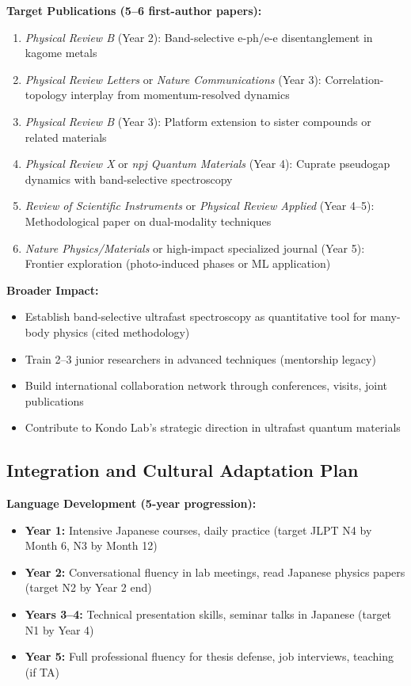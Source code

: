 \documentclass[12pt,a4paper]{article}
\begin{document}
\textbf{Target Publications (5--6 first-author papers):}
\begin{enumerate}
    \item \textit{Physical Review B} (Year 2): Band-selective e-ph/e-e disentanglement in kagome metals
    \item \textit{Physical Review Letters} or \textit{Nature Communications} (Year 3): Correlation-topology interplay from momentum-resolved dynamics
    \item \textit{Physical Review B} (Year 3): Platform extension to sister compounds or related materials
    \item \textit{Physical Review X} or \textit{npj Quantum Materials} (Year 4): Cuprate pseudogap dynamics with band-selective spectroscopy
    \item \textit{Review of Scientific Instruments} or \textit{Physical Review Applied} (Year 4--5): Methodological paper on dual-modality techniques
    \item \textit{Nature Physics/Materials} or high-impact specialized journal (Year 5): Frontier exploration (photo-induced phases or ML application)
\end{enumerate}

\textbf{Broader Impact:}
\begin{itemize}
    \item Establish band-selective ultrafast spectroscopy as quantitative tool for many-body physics (cited methodology)
    \item Train 2--3 junior researchers in advanced techniques (mentorship legacy)
    \item Build international collaboration network through conferences, visits, joint publications
    \item Contribute to Kondo Lab's strategic direction in ultrafast quantum materials
\end{itemize}

\subsection{Integration and Cultural Adaptation Plan}

\textbf{Language Development (5-year progression):}
\begin{itemize}
    \item \textbf{Year 1:} Intensive Japanese courses, daily practice (target JLPT N4 by Month 6, N3 by Month 12)
    \item \textbf{Year 2:} Conversational fluency in lab meetings, read Japanese physics papers (target N2 by Year 2 end)
    \item \textbf{Years 3--4:} Technical presentation skills, seminar talks in Japanese (target N1 by Year 4)
    \item \textbf{Year 5:} Full professional fluency for thesis defense, job interviews, teaching (if TA)
\end{itemize}
\end{document}
